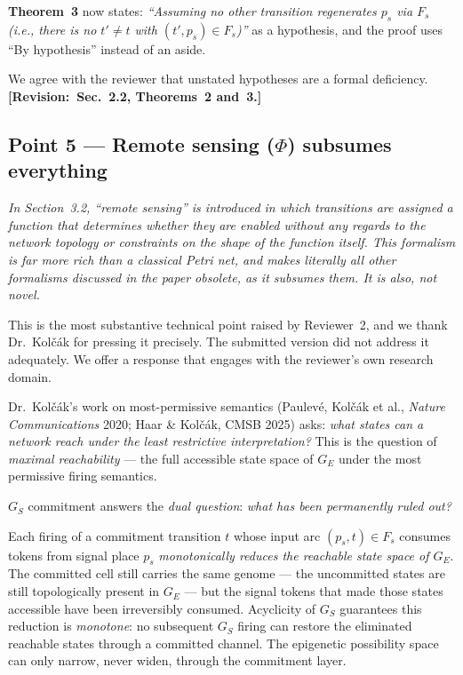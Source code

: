 \documentclass[11pt,letterpaper]{article}
\newcommand{\rquote}[1]{\begin{mdframed}[style=reviewquote]\textit{#1}\end{mdframed}}
\newcommand{\sref}[1]{\textbf{[Revision:~#1]}}
\begin{document}
\textbf{Theorem~3} now states: \textit{``Assuming no other transition
regenerates $p_s$ via $F_s$ (i.e., there is no $t' \neq t$ with
$(t', p_s) \in F_s$)''} as a hypothesis, and the proof uses ``By hypothesis''
instead of an aside.

We agree with the reviewer that unstated hypotheses are a formal deficiency.
\sref{Sec.~2.2, Theorems~2 and~3.}

\subsection*{Point 5 --- Remote sensing ($\Phi$) subsumes everything}

\rquote{In Section~3.2, ``remote sensing'' is introduced in which transitions
are assigned a function that determines whether they are enabled without any
regards to the network topology or constraints on the shape of the function
itself. This formalism is far more rich than a classical Petri net, and makes
literally all other formalisms discussed in the paper obsolete, as it subsumes
them. It is also, not novel.}

This is the most substantive technical point raised by Reviewer~2, and we
thank Dr.~Kolč{\'a}k for pressing it precisely. The submitted version did not
address it adequately. We offer a response that engages with the reviewer's own
research domain.

Dr.~Kolč{\'a}k's work on most-permissive semantics (Paulev{\'e}, Kolč{\'a}k
et al., \textit{Nature Communications} 2020; Haar \& Kolč{\'a}k, CMSB 2025)
asks: \emph{what states can a network reach under the least restrictive
interpretation?} This is the question of \emph{maximal reachability} --- the
full accessible state space of $G_E$ under the most permissive firing semantics.

$G_S$ commitment answers the \emph{dual question}: \emph{what has been
permanently ruled out?}

Each firing of a commitment transition $t$ whose input arc $(p_s, t) \in F_s$
consumes tokens from signal place $p_s$ \emph{monotonically reduces the
reachable state space of $G_E$}. The committed cell still carries the same
genome --- the uncommitted states are still topologically present in $G_E$ ---
but the signal tokens that made those states accessible have been irreversibly
consumed. Acyclicity of $G_S$ guarantees this reduction is \emph{monotone}: no
subsequent $G_S$ firing can restore the eliminated reachable states through a
committed channel. The epigenetic possibility space can only narrow, never
widen, through the commitment layer.
\end{document}
